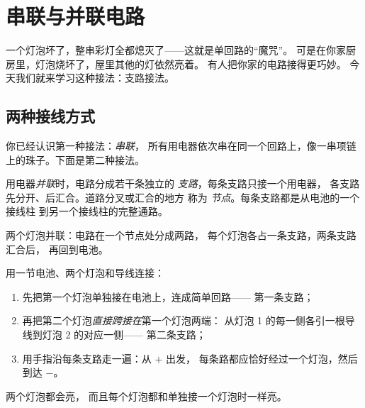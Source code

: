\chapter{串联与并联电路}\label{ch:g5:series-parallel-circuits}

一个灯泡坏了，整串彩灯全都熄灭了——这就是单回路的“魔咒”。
可是在你家厨房里，灯泡烧坏了，屋里其他的灯依然亮着。
有人把你家的电路接得更巧妙。
今天我们就来学习这种接法：支路接法。

\section{两种接线方式}

你已经认识第一种接法：\emph{串联}，
所有用电器依次串在同一个回路上，像一串项链上的珠子。下面是第二种接法。

\begin{definition}[并联]\label{def:g5:series-parallel-circuits:parallel}
用电器\emph{并联}时，电路分成若干条独立的
\emph{支路}，每条支路只接一个用电器，
各支路先分开、后汇合。道路分叉或汇合的地方
称为
\emph{节点}。每条支路都是从电池的一个接线柱
到另一个接线柱的完整通路。
\end{definition}

\begin{omfigure}

{\small 两个灯泡并联：电路在一个节点处分成两路，
每个灯泡各占一条支路，两条支路汇合后，
再回到电池。}
\end{omfigure}

\begin{method}[连接方法]\label{met:g5:series-parallel-circuits:build}
用一节电池、两个灯泡和导线连接：
\begin{enumerate}
  \item 先把第一个灯泡单独接在电池上，连成简单回路——
        第一条支路；
  \item 再把第二个灯泡\emph{直接跨接在}第一个灯泡两端：
        从灯泡 1 的每一侧各引一根导线到灯泡 2 的对应一侧——
        第二条支路；
  \item 用手指沿每条支路走一遍：从 $+$ 出发，
        每条路都应恰好经过一个灯泡，然后到达 $-$。
\end{enumerate}
两个灯泡都会亮，
而且每个灯泡都和单独接一个灯泡时一样亮。
\end{method}

